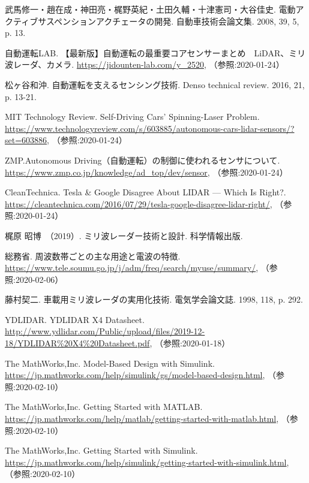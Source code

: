 {\small
\begin{thebibliography}{9}
   武馬修一・趙在成・神田亮・梶野英紀・土田久輔・十津憲司・大谷佳史. 電動アクティブサスペンションアクチェータの開発. 自動車技術会論文集. 2008, 39, 5, p. 13.

   自動運転LAB. 【最新版】自動運転の最重要コアセンサーまとめ　LiDAR、ミリ波レーダ、カメラ. \url{https://jidounten-lab.com/y_2520}, （参照:2020-01-24）

   松ヶ谷和沖. 自動運転を支えるセンシング技術. Denso technical review. 2016, 21, p. 13-21.

   MIT Technology Review. Self-Driving Cars’ Spinning-Laser Problem. \url{https://www.technologyreview.com/s/603885/autonomous-cars-lidar-sensors/?set=603886}, （参照:2020-01-24）

   ZMP.Autonomous Driving（自動運転）の制御に使われるセンサについて. \url{https://www.zmp.co.jp/knowledge/ad_top/dev/sensor}, （参照:2020-01-24）

   CleanTechnica. Tesla \& Google Disagree About LIDAR — Which Is Right?. \url{https://cleantechnica.com/2016/07/29/tesla-google-disagree-lidar-right/}, （参照:2020-01-24）


  梶原 昭博　（2019）. ミリ波レーダー技術と設計. 科学情報出版.

   総務省. 周波数帯ごとの主な用途と電波の特徴. \url{https://www.tele.soumu.go.jp/j/adm/freq/search/myuse/summary/}, （参照:2020-02-06）

   藤村契二. 車載用ミリ波レーダの実用化技術. 電気学会論文誌. 1998, 118, p. 292.

   YDLIDAR. YDLIDAR X4 Datasheet. \url{http://www.ydlidar.com/Public/upload/files/2019-12-18/YDLIDAR%20X4%20Datasheet.pdf}, （参照:2020-01-18）

   The MathWorks,Inc. Model-Based Design with Simulink. \url{https://jp.mathworks.com/help/simulink/gs/model-based-design.html}, （参照:2020-02-10）

   The MathWorks,Inc. Getting Started with MATLAB. \url{https://jp.mathworks.com/help/matlab/getting-started-with-matlab.html}, （参照:2020-02-10）

   The MathWorks,Inc. Getting Started with Simulink. \url{https://jp.mathworks.com/help/simulink/getting-started-with-simulink.html}, （参照:2020-02-10）





\end{thebibliography}
}